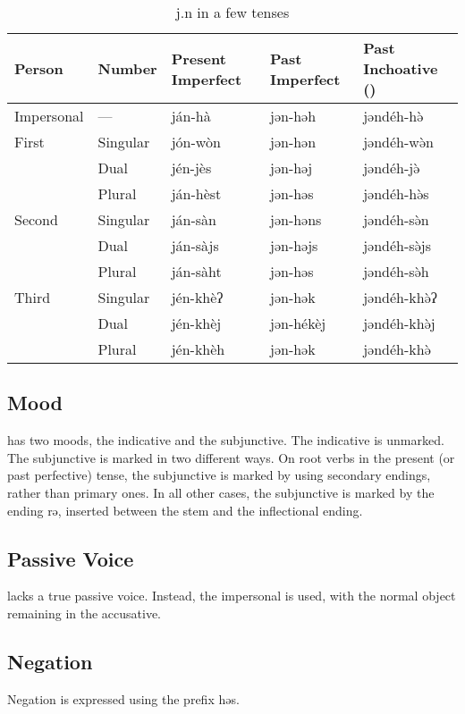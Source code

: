 \begin{table}[h]
\centering
\caption{{\ll j.n}  in a few tenses}
\begin{tabu} to 
    \toprule
    Person & Number & \rm Present Imperfect & \rm Past Imperfect & \rm Past
    Inchoative () \\ \midrule
    Impersonal & —        & ján-hà   & jən-həh   & jəndéh-hə̀   \\ \midrule
    First      & Singular & jón-wòn  & jən-hən   & jəndéh-wə̀n  \\
               & Dual     & jén-jès  & jən-həj   & jəndéh-jə̀   \\
               & Plural   & ján-hèst & jən-həs   & jəndéh-hə̀s  \\ \midrule
    Second     & Singular & ján-sàn  & jən-həns  & jəndéh-sə̀n  \\
               & Dual     & ján-sàjs & jən-həjs  & jəndéh-sə̀js \\
               & Plural   & ján-sàht & jən-həs   & jəndéh-sə̀h  \\ \midrule
    Third      & Singular & jén-khèʔ & jən-hək   & jəndéh-khə̀ʔ \\
               & Dual     & jén-khèj & jən-hékèj & jəndéh-khə̀j \\
               & Plural   & jén-khèh & jən-hək   & jəndéh-khə̀  \\
    \bottomrule
\end{tabu}
\end{table}

\subsection{Mood}
\Langname{} has two moods, the indicative and the subjunctive. The indicative
is unmarked. The subjunctive is marked in two different ways. On root verbs in
the present (or past perfective) tense, the subjunctive is marked by using
secondary endings, rather than primary ones. In all other cases, the
subjunctive is marked by the ending {\ll rə}, inserted between the stem and the
inflectional ending.

\subsection{Passive Voice}
\Langname{} lacks a true passive voice. Instead, the impersonal is used, with
the normal object remaining in the accusative.

\subsection{Negation}
Negation is expressed using the prefix {\ll həs}.

